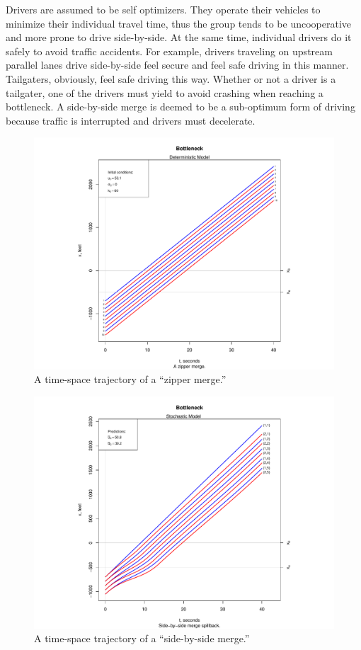 \documentclass[Proceedings]{ascelike}
\begin{document}
Drivers are assumed to be self optimizers.  They operate their vehicles to minimize their individual travel time, thus the group tends to be uncooperative and more prone to drive side-by-side. At the same time, individual drivers do it safely to avoid traffic accidents. For example, drivers traveling on upstream parallel lanes drive side-by-side feel secure and feel safe driving in this manner. Tailgaters, obviously, feel safe driving this way. Whether or not a driver is a tailgater, one of the drivers must yield to avoid crashing when reaching a bottleneck. A side-by-side merge is deemed to be a sub-optimum form of driving because traffic is interrupted and drivers must decelerate.  

\begin{figure}
\centering
\includegraphics[width = 7in]{Rplot01.pdf}
\caption{A time-space trajectory of a ``zipper merge.''}
\label{zipmodel}
\end{figure}


\begin{figure}
\centering
\includegraphics[width = 7in]{Rplot04.pdf}
\caption{A time-space trajectory of a ``side-by-side merge.''}
\label{sbsmodel}
\end{figure}
\end{document}
